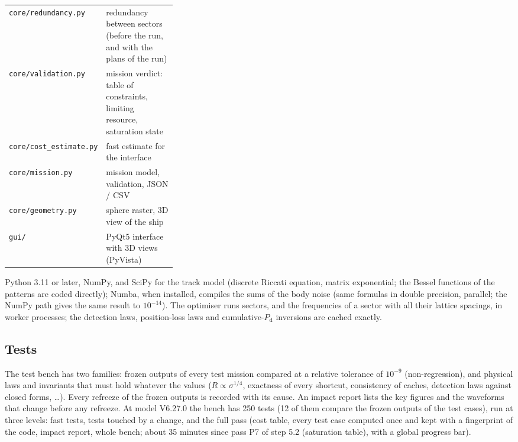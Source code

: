 \documentclass[11pt,a4paper]{article}
\newcommand{\code}[1]{\texttt{\small #1}}
\newcommand{\Pd}{P_{\mathrm d}}
\begin{document}
\begin{center}
\begin{tabularx}{\linewidth}{@{}>{\raggedright\arraybackslash}p{0.33\linewidth}L@{}}
\code{core/redundancy.py} & redundancy between sectors (before the run, and with the plans of the run)\\
\code{core/validation.py} & mission verdict: table of constraints, limiting resource, saturation state\\
\code{core/cost\_estimate.py} & fast estimate for the interface\\
\code{core/mission.py} & mission model, validation, JSON / CSV\\
\code{core/geometry.py} & sphere raster, 3D view of the ship\\
\code{gui/} & PyQt5 interface with 3D views (PyVista)\\
\bottomrule
\end{tabularx}
\end{center}
Python 3.11 or later, NumPy, and SciPy for the track model (discrete Riccati equation, matrix exponential; the
Bessel functions of the patterns are coded directly); Numba, when
installed, compiles the sums of the body noise (same formulas in double precision, parallel; the NumPy path gives the
same result to $10^{-14}$). The optimiser runs sectors, and the frequencies of a sector with all their lattice spacings,
in worker processes; the detection laws, position-loss laws and cumulative-$\Pd$ inversions are cached exactly.

\subsection{Tests}
The test bench has two families: frozen outputs of every test mission compared at a relative tolerance of $10^{-9}$
(non-regression), and physical laws and invariants that must hold whatever the values ($R\propto\sigma^{1/4}$,
exactness of every shortcut, consistency of caches, detection laws against closed forms, \dots). Every refreeze of the
frozen outputs is recorded with its cause. An impact report lists the key figures and the waveforms that change
before any refreeze. At model V6.27.0 the bench has 250 tests (12 of them compare the frozen outputs of the test cases), run at three levels: fast tests, tests touched by a change, and the full pass (cost table, every test case computed once and kept with a fingerprint of the code, impact report, whole bench; about 35 minutes since pass P7 of step 5.2 (saturation table), with a global progress bar).

\end{document}
